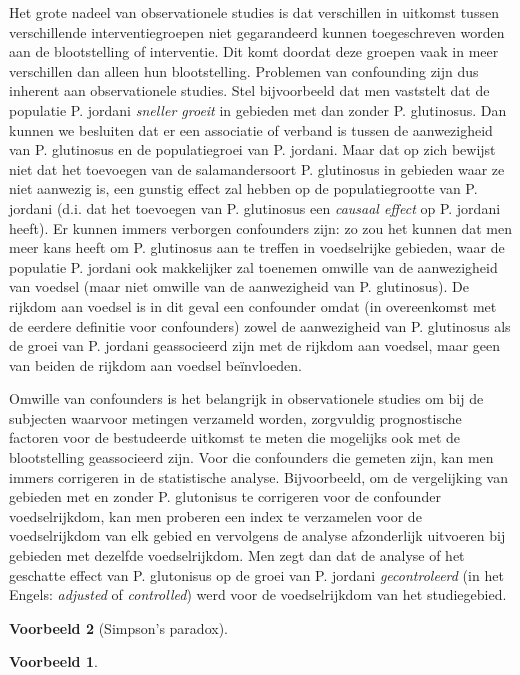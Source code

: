 \documentclass[
  12pt,dutch,coursenotes]{book}
\theoremstyle{definition}
\theoremstyle{definition}
\newtheorem{example}{Voorbeeld}[chapter]
\theoremstyle{definition}
\theoremstyle{remark}
\begin{document}
Het grote nadeel van observationele studies is dat verschillen in uitkomst
tussen verschillende interventiegroepen niet gegarandeerd kunnen
toegeschreven worden aan de blootstelling of interventie. Dit komt doordat deze groepen
vaak in meer verschillen dan alleen hun blootstelling. Problemen van
confounding zijn dus inherent aan observationele studies. Stel bijvoorbeeld
dat men vaststelt dat de populatie P. jordani \emph{sneller groeit} in gebieden met
dan zonder P. glutinosus. Dan kunnen we besluiten dat
er een associatie of verband is tussen de aanwezigheid van P. glutinosus en de populatiegroei van P. jordani. Maar dat op zich
bewijst niet dat het toevoegen van de salamandersoort P. glutinosus in gebieden waar ze niet aanwezig is, een gunstig effect zal hebben op de populatiegrootte van P. jordani (d.i. dat het toevoegen van P. glutinosus een \emph{causaal effect} op P. jordani heeft). Er kunnen immers verborgen confounders zijn: zo zou het kunnen dat men meer kans heeft om P. glutinosus aan te treffen in voedselrijke gebieden, waar de populatie P. jordani ook makkelijker zal toenemen omwille van de aanwezigheid van voedsel (maar niet omwille van de aanwezigheid van P. glutinosus).
De rijkdom aan voedsel is in dit geval
een confounder omdat (in overeenkomst met de eerdere definitie voor
confounders) zowel de aanwezigheid van P. glutinosus als de groei van P. jordani
geassocieerd zijn met de rijkdom aan voedsel, maar geen van beiden de rijkdom aan voedsel beïnvloeden.

Omwille van confounders is het belangrijk in observationele studies om bij
de subjecten waarvoor metingen verzameld worden, zorgvuldig prognostische factoren voor de bestudeerde uitkomst te meten die mogelijks ook met de blootstelling geassocieerd zijn.
Voor die confounders die gemeten zijn, kan men immers corrigeren in de
statistische analyse. Bijvoorbeeld, om de vergelijking van gebieden met en
zonder P. glutonisus te corrigeren voor de confounder voedselrijkdom, kan men proberen een index te verzamelen voor de voedselrijkdom van elk gebied en vervolgens de analyse
afzonderlijk uitvoeren bij gebieden met dezelfde voedselrijkdom.
Men zegt dan dat de analyse of het geschatte
effect van P. glutonisus op de groei van P. jordani \emph{gecontroleerd} (in het Engels:
\emph{adjusted} of \emph{controlled}) werd voor de voedselrijkdom van het studiegebied.

\begin{example}[Simpson's paradox]
\begin{example}

\protect\hypertarget{exm:unnamed-chunk-82}{}{\label{exm:unnamed-chunk-82} \iffalse (Simpson's paradox) \fi{} }

\end{example}
\end{example}
\end{document}
